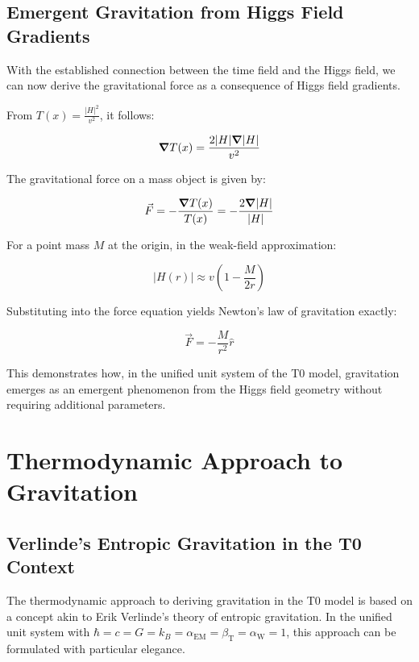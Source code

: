 \documentclass[12pt,a4paper]{article}
\newcommand{\Tfield}{T(x)}
\newcommand{\betaT}{\beta_{\text{T}}}
\newcommand{\alphaEM}{\alpha_{\text{EM}}}
\newcommand{\alphaW}{\alpha_{\text{W}}}
\begin{document}
	\subsection{Emergent Gravitation from Higgs Field Gradients}
	With the established connection between the time field and the Higgs field, we can now derive the gravitational force as a consequence of Higgs field gradients.
	
	From \(\Tfield = \frac{|H|^2}{v^2}\), it follows:
	
	\begin{equation}
		\grad \Tfield = \frac{2|H|\grad|H|}{v^2}
	\end{equation}
	
	The gravitational force on a mass object is given by:
	
	\begin{equation}
		\vec{F} = -\frac{\grad \Tfield}{\Tfield} = -\frac{2\grad|H|}{|H|}
	\end{equation}
	
	For a point mass \(M\) at the origin, in the weak-field approximation:
	
	\begin{equation}
		|H(r)| \approx v\left(1 - \frac{M}{2r}\right)
	\end{equation}
	
	Substituting into the force equation yields Newton’s law of gravitation exactly:
	
	\begin{equation}
		\vec{F} = -\frac{M}{r^2} \hat{r}
	\end{equation}
	
	This demonstrates how, in the unified unit system of the T0 model, gravitation emerges as an emergent phenomenon from the Higgs field geometry without requiring additional parameters.
	
	\section{Thermodynamic Approach to Gravitation}
	
	\subsection{Verlinde’s Entropic Gravitation in the T0 Context}
	The thermodynamic approach to deriving gravitation in the T0 model is based on a concept akin to Erik Verlinde’s theory of entropic gravitation. In the unified unit system with \(\hbar = c = G = k_B = \alphaEM = \betaT = \alphaW = 1\), this approach can be formulated with particular elegance.
	
\end{document}
